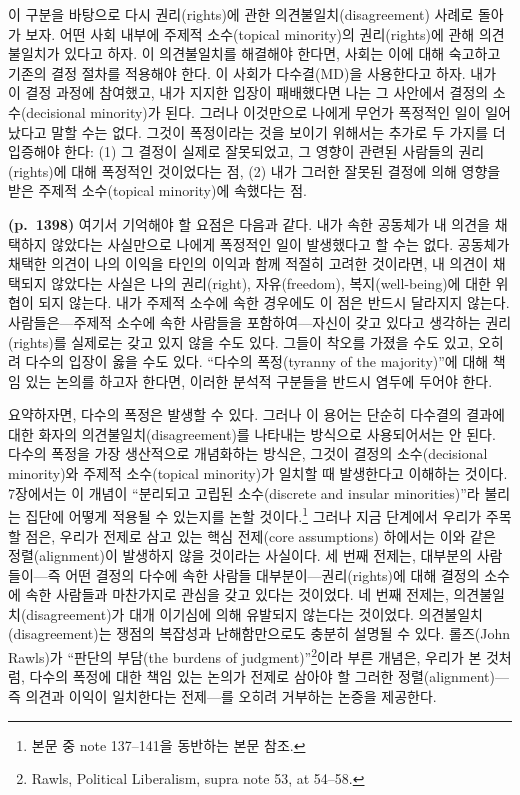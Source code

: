 \documentclass[a4paper,12pt,oneside]{article}  %
\begin{document}
이 구분을 바탕으로 다시 권리(rights)에 관한 의견불일치(disagreement)
사례로 돌아가 보자. 어떤 사회 내부에 주제적 소수(topical minority)의
권리(rights)에 관해 의견불일치가 있다고 하자. 이 의견불일치를 해결해야
한다면, 사회는 이에 대해 숙고하고 기존의 결정 절차를 적용해야 한다. 이
사회가 다수결(MD)을 사용한다고 하자. 내가 이 결정 과정에 참여했고, 내가
지지한 입장이 패배했다면 나는 그 사안에서 결정의 소수(decisional
minority)가 된다. 그러나 이것만으로 나에게 무언가 폭정적인 일이
일어났다고 말할 수는 없다. 그것이 폭정이라는 것을 보이기 위해서는 추가로
두 가지를 더 입증해야 한다: (1) 그 결정이 실제로 잘못되었고, 그 영향이
관련된 사람들의 권리(rights)에 대해 폭정적인 것이었다는 점, (2) 내가
그러한 잘못된 결정에 의해 영향을 받은 주제적 소수(topical minority)에
속했다는 점.

\textbf{(p.~1398)} 여기서 기억해야 할 요점은 다음과 같다. 내가 속한
공동체가 내 의견을 채택하지 않았다는 사실만으로 나에게 폭정적인 일이
발생했다고 할 수는 없다. 공동체가 채택한 의견이 나의 이익을 타인의
이익과 함께 적절히 고려한 것이라면, 내 의견이 채택되지 않았다는 사실은
나의 권리(right), 자유(freedom), 복지(well-being)에 대한 위협이 되지
않는다. 내가 주제적 소수에 속한 경우에도 이 점은 반드시 달라지지 않는다.
사람들은---주제적 소수에 속한 사람들을 포함하여---자신이 갖고 있다고
생각하는 권리(rights)를 실제로는 갖고 있지 않을 수도 있다. 그들이 착오를
가졌을 수도 있고, 오히려 다수의 입장이 옳을 수도 있다. ``다수의
폭정(tyranny of the majority)''에 대해 책임 있는 논의를 하고자 한다면,
이러한 분석적 구분들을 반드시 염두에 두어야 한다.

요약하자면, 다수의 폭정은 발생할 수 있다. 그러나 이 용어는 단순히
다수결의 결과에 대한 화자의 의견불일치(disagreement)를 나타내는 방식으로
사용되어서는 안 된다. 다수의 폭정을 가장 생산적으로 개념화하는 방식은,
그것이 결정의 소수(decisional minority)와 주제적 소수(topical
minority)가 일치할 때 발생한다고 이해하는 것이다. 7장에서는 이 개념이
``분리되고 고립된 소수(discrete and insular minorities)''라 불리는
집단에 어떻게 적용될 수 있는지를 논할 것이다.\footnote{본문 중 note
  137--141을 동반하는 본문 참조.} 그러나 지금 단계에서 우리가 주목할
점은, 우리가 전제로 삼고 있는 핵심 전제(core assumptions) 하에서는 이와
같은 정렬(alignment)이 발생하지 않을 것이라는 사실이다. 세 번째 전제는,
대부분의 사람들이---즉 어떤 결정의 다수에 속한 사람들
대부분이---권리(rights)에 대해 결정의 소수에 속한 사람들과 마찬가지로
관심을 갖고 있다는 것이었다. 네 번째 전제는, 의견불일치(disagreement)가
대개 이기심에 의해 유발되지 않는다는 것이었다.
의견불일치(disagreement)는 쟁점의 복잡성과 난해함만으로도 충분히 설명될
수 있다. 롤즈(John Rawls)가 ``판단의 부담(the burdens of
judgment)''\footnote{Rawls, Political Liberalism, supra note 53, at
  54--58.}이라 부른 개념은, 우리가 본 것처럼, 다수의 폭정에 대한 책임
있는 논의가 전제로 삼아야 할 그러한 정렬(alignment)---즉 의견과 이익이
일치한다는 전제---를 오히려 거부하는 논증을 제공한다.
\end{document}
